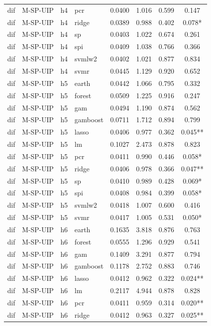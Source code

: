 \begin{ThreePartTable}
\begin{longtable}[t]{llclcccc}
dif & M-SP-UIP & h4 & pcr & 0.0400 & 1.016 & 0.599 & 0.147\\
dif & M-SP-UIP & h4 & ridge & 0.0389 & 0.988 & 0.402 & 0.078*\\
dif & M-SP-UIP & h4 & sp & 0.0403 & 1.022 & 0.674 & 0.261\\
dif & M-SP-UIP & h4 & spi & 0.0409 & 1.038 & 0.766 & 0.366\\
dif & M-SP-UIP & h4 & svmlw2 & 0.0402 & 1.021 & 0.877 & 0.834\\
dif & M-SP-UIP & h4 & svmr & 0.0445 & 1.129 & 0.920 & 0.652\\
\addlinespace
dif & M-SP-UIP & h5 & earth & 0.0442 & 1.066 & 0.795 & 0.332\\
dif & M-SP-UIP & h5 & forest & 0.0509 & 1.225 & 0.916 & 0.247\\
dif & M-SP-UIP & h5 & gam & 0.0494 & 1.190 & 0.874 & 0.562\\
dif & M-SP-UIP & h5 & gamboost & 0.0711 & 1.712 & 0.894 & 0.799\\
dif & M-SP-UIP & h5 & lasso & 0.0406 & 0.977 & 0.362 & 0.045**\\
dif & M-SP-UIP & h5 & lm & 0.1027 & 2.473 & 0.878 & 0.823\\
dif & M-SP-UIP & h5 & pcr & 0.0411 & 0.990 & 0.446 & 0.058*\\
dif & M-SP-UIP & h5 & ridge & 0.0406 & 0.978 & 0.366 & 0.047**\\
dif & M-SP-UIP & h5 & sp & 0.0410 & 0.989 & 0.428 & 0.069*\\
dif & M-SP-UIP & h5 & spi & 0.0408 & 0.984 & 0.399 & 0.058*\\
dif & M-SP-UIP & h5 & svmlw2 & 0.0418 & 1.007 & 0.600 & 0.416\\
dif & M-SP-UIP & h5 & svmr & 0.0417 & 1.005 & 0.531 & 0.050*\\
\addlinespace
dif & M-SP-UIP & h6 & earth & 0.1635 & 3.818 & 0.876 & 0.763\\
dif & M-SP-UIP & h6 & forest & 0.0555 & 1.296 & 0.929 & 0.541\\
dif & M-SP-UIP & h6 & gam & 0.1409 & 3.291 & 0.877 & 0.794\\
dif & M-SP-UIP & h6 & gamboost & 0.1178 & 2.752 & 0.883 & 0.746\\
dif & M-SP-UIP & h6 & lasso & 0.0412 & 0.962 & 0.322 & 0.024**\\
dif & M-SP-UIP & h6 & lm & 0.2117 & 4.944 & 0.878 & 0.828\\
dif & M-SP-UIP & h6 & pcr & 0.0411 & 0.959 & 0.314 & 0.020**\\
dif & M-SP-UIP & h6 & ridge & 0.0412 & 0.963 & 0.327 & 0.025**\\

\end{longtable}
\end{ThreePartTable}
